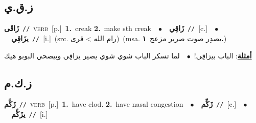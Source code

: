 \documentclass[10pt,a4paper,twoside]{article} %
\begin{document}
\begin{multicols}{2}
\vspace{-3mm}
\subsection*{\color{blue}\foreignlanguage{arabic}{ز.ق.ي}\color{blue}{}} 

{\setlength\topsep{0pt}\textbf{\foreignlanguage{arabic}{زَاقَى}}\ {\color{gray}\texttt{//}\color{black}}\ \textsc{verb}\ [p.]\ \textbf{1.}~creak  \textbf{2.}~make sth creak\ \ $\bullet$\ \ \setlength\topsep{0pt}\textbf{\foreignlanguage{arabic}{زَاقِي}}\ {\color{gray}\texttt{//}\color{black}}\ [c.]\ \ $\bullet$\ \ \setlength\topsep{0pt}\textbf{\foreignlanguage{arabic}{يزَاقِي}}\ {\color{gray}\texttt{//}\color{black}}\ [i.]\ (src. \color{gray}\foreignlanguage{arabic}{رام الله > قرى}\color{black})\ \color{gray}(msa. \foreignlanguage{arabic}{يصدِر صوت صرير مزعج}~\foreignlanguage{arabic}{\textbf{١.}})\color{black}\  \begin{flushright}\color{gray}\foreignlanguage{arabic}{\textbf{\underline{\foreignlanguage{arabic}{أمثلة}}}: الباب بيزاقِي!\ $\bullet$\ \  لما تسكر الباب شوي شوي يصير يزاقِي وبيصحي البوبو هيك}\end{flushright}\color{black}} \vspace{2mm}

\vspace{-3mm}
\subsection*{\color{blue}\foreignlanguage{arabic}{ز.ك.م}\color{blue}{}} 

{\setlength\topsep{0pt}\textbf{\foreignlanguage{arabic}{زَكَّم}}\ {\color{gray}\texttt{//}\color{black}}\ \textsc{verb}\ [p.]\ \textbf{1.}~have clod.  \textbf{2.}~have nasal congestion\ \ $\bullet$\ \ \setlength\topsep{0pt}\textbf{\foreignlanguage{arabic}{زَكِّم}}\ {\color{gray}\texttt{//}\color{black}}\ [c.]\ \ $\bullet$\ \ \setlength\topsep{0pt}\textbf{\foreignlanguage{arabic}{يزَكِّم}}\ {\color{gray}\texttt{//}\color{black}}\ [i.]\ } \vspace{2mm}


\end{multicols}
\end{document}
